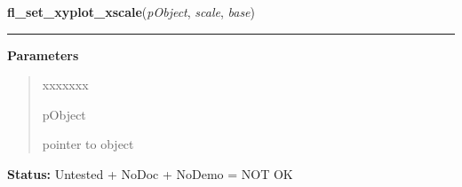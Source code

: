     \label{xformslib:library:fl_set_xyplot_xscale}

    \vspace{0.5ex}

\hspace{.8\funcindent}\begin{boxedminipage}{\funcwidth}

    \raggedright \textbf{fl\_set\_xyplot\_xscale}(\textit{pObject}, \textit{scale}, \textit{base})

    \vspace{-1.5ex}

    \rule{\textwidth}{0.5\fboxrule}
\setlength{\parskip}{2ex}
\setlength{\parskip}{1ex}
      \textbf{Parameters}
      \vspace{-1ex}

      \begin{quote}
        \begin{Ventry}{xxxxxxx}

          \item[pObject]

          pointer to object

        \end{Ventry}

      \end{quote}

\textbf{Status:} Untested + NoDoc + NoDemo = NOT OK



    \end{boxedminipage}

    \label{xformslib:library:fl_set_xyplot_yscale}

    \vspace{0.5ex}


